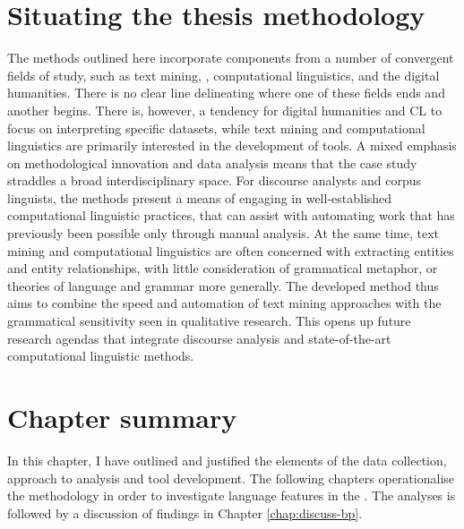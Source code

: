 \section{Situating the thesis methodology}

The methods outlined here incorporate components from a number of convergent fields of study, such as text mining, , computational linguistics, and the digital humanities. There is no clear line delineating where one of these fields ends and another begins. There is, however, a tendency for digital humanities and \gls{CL} to focus on interpreting specific datasets, while text mining and computational linguistics are primarily interested in the development of tools. A mixed emphasis on methodological innovation and data analysis means that the case study straddles a broad interdisciplinary space. For discourse analysts and corpus linguists, the methods present a means of engaging in well\hyp{}established computational linguistic practices, that can assist with automating work that has previously been possible only through manual analysis. At the same time, text mining and computational linguistics are often concerned with extracting entities and entity relationships, with little consideration of grammatical metaphor, or theories of language and grammar more generally. The developed method thus aims to combine the speed and automation of text mining approaches with the grammatical sensitivity seen in qualitative research. This opens up future research agendas that integrate discourse analysis and state\hyp{}of\hyp{}the\hyp{}art computational linguistic methods.

\section{Chapter summary}

In this chapter, I have outlined and justified the elements of the data collection, approach to analysis and tool development. The following chapters operationalise the methodology in order to investigate language features in the . The analyses is followed by a discussion of findings in Chapter \ref{chap:discuss-bp}.





